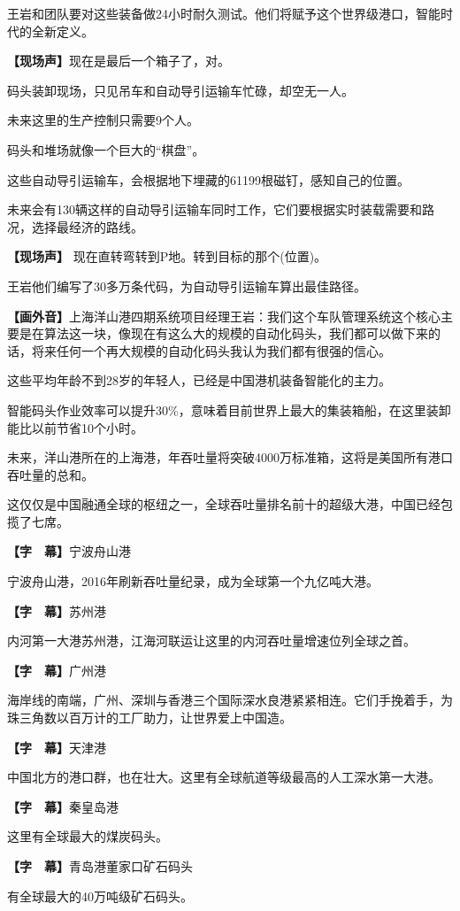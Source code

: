 \documentclass{ctexart}
\newcommand{\zkh}[1]{\textbf{\hspace{-2.7em} 【#1】}}
\begin{document}
王岩和团队要对这些装备做24小时耐久测试。他们将赋予这个世界级港口，智能时代的全新定义。

 \zkh{现场声}现在是最后一个箱子了，对。

 码头装卸现场，只见吊车和自动导引运输车忙碌，却空无一人。

 未来这里的生产控制只需要9个人。

 码头和堆场就像一个巨大的``棋盘''。

 这些自动导引运输车，会根据地下埋藏的61199根磁钉，感知自己的位置。

未来会有130辆这样的自动导引运输车同时工作，它们要根据实时装载需要和路况，选择最经济的路线。

 \zkh{现场声} 现在直转弯转到P地。转到目标的那个(位置)。

 王岩他们编写了30多万条代码，为自动导引运输车算出最佳路径。

\zkh{画外音}上海洋山港四期系统项目经理王岩：我们这个车队管理系统这个核心主要是在算法这一块，像现在有这么大的规模的自动化码头，我们都可以做下来的话，将来任何一个再大规模的自动化码头我认为我们都有很强的信心。

 这些平均年龄不到28岁的年轻人，已经是中国港机装备智能化的主力。

智能码头作业效率可以提升30{\%}，意味着目前世界上最大的集装箱船，在这里装卸能比以前节省10个小时。

未来，洋山港所在的上海港，年吞吐量将突破4000万标准箱，这将是美国所有港口吞吐量的总和。

 
这仅仅是中国融通全球的枢纽之一，全球吞吐量排名前十的超级大港，中国已经包揽了七席。

 \zkh{字　幕}宁波舟山港

 宁波舟山港，2016年刷新吞吐量纪录，成为全球第一个九亿吨大港。

 \zkh{字　幕}苏州港

 
内河第一大港苏州港，江海河联运让这里的内河吞吐量增速位列全球之首。

 \zkh{字　幕}广州港

 
海岸线的南端，广州、深圳与香港三个国际深水良港紧紧相连。它们手挽着手，为珠三角数以百万计的工厂助力，让世界爱上中国造。

 \zkh{字　幕}天津港

 
中国北方的港口群，也在壮大。这里有全球航道等级最高的人工深水第一大港。

 \zkh{字　幕}秦皇岛港

 这里有全球最大的煤炭码头。

 \zkh{字　幕}青岛港董家口矿石码头

 有全球最大的40万吨级矿石码头。
\end{document}
